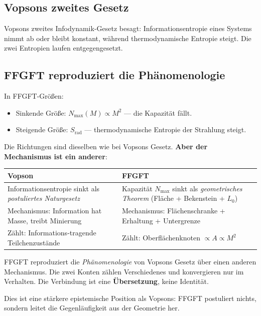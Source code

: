 \subsection{Vopsons zweites Gesetz}

Vopsons zweites Infodynamik-Gesetz besagt: Informationsentropie eines Systems nimmt ab oder bleibt konstant, während thermodynamische Entropie steigt. Die zwei Entropien laufen entgegengesetzt.

\subsection{FFGFT reproduziert die Phänomenologie}

In FFGFT-Größen:
\begin{itemize}
  \item Sinkende Größe: $N_\text{max}(M) \propto M^2$ --- die Kapazität fällt.
  \item Steigende Größe: $S_\text{rad}$ --- thermodynamische Entropie der Strahlung steigt.
\end{itemize}

Die Richtungen sind dieselben wie bei Vopsons Gesetz. \textbf{Aber der Mechanismus ist ein anderer}:

\begin{center}
\begin{tabular}{p{5cm}p{8cm}}
\toprule
\textbf{Vopson} & \textbf{FFGFT} \\
\midrule
Informationsentropie sinkt als \emph{postuliertes Naturgesetz} & Kapazität $N_\text{max}$ sinkt als \emph{geometrisches Theorem} (Fläche + Bekenstein + $L_0$) \\
Mechanismus: Information hat Masse, treibt Minierung & Mechanismus: Flächenschranke + Erhaltung + Untergrenze \\
Zählt: Informations-tragende Teilchenzustände & Zählt: Oberflächenknoten $\propto A \propto M^2$ \\
\bottomrule
\end{tabular}
\end{center}

\begin{keyresult}
FFGFT reproduziert die \emph{Phänomenologie} von Vopsons Gesetz über einen anderen Mechanismus. Die zwei Konten zählen Verschiedenes und konvergieren nur im Verhalten. Die Verbindung ist eine \textbf{Übersetzung}, keine Identität.

Dies ist eine stärkere epistemische Position als Vopsons: FFGFT postuliert nichts, sondern leitet die Gegenläufigkeit aus der Geometrie her.
\end{keyresult}

